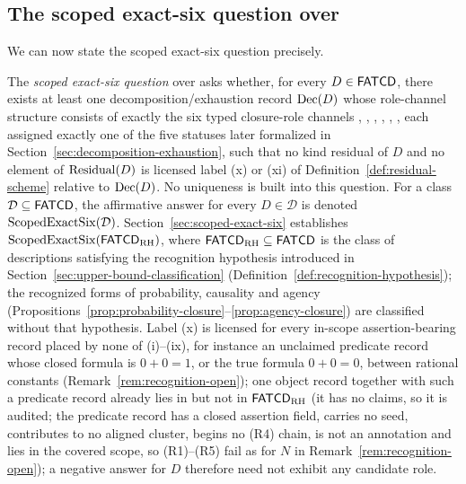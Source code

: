 \subsection{The scoped exact-six question over \FATCD{}}\label{subsec:scoped-exact-six-question}

We can now state the scoped exact-six question precisely.

\begin{definition}\label{def:scoped-exact-six-question}
The \emph{scoped exact-six question} over \FATCD{} asks whether, for every
\(D \in \mathsf{FATCD}{}\), there exists at least one decomposition/exhaustion record
\(\operatorname{Dec}\!\left(D\right)\) whose role-channel structure consists of exactly the six typed
closure-role channels \Pone{}, \Ptwo{}, \Pthree{}, \Pfour{}, \Pfive{},
\Psix{}, each assigned exactly one of the five statuses later formalized in
Section~\ref{sec:decomposition-exhaustion}, such that no kind residual of
\(D\) and no element of \(\operatorname{Residual}\!\left(D\right)\) is licensed label (x) or (xi) of
Definition~\ref{def:residual-scheme} relative to \(\operatorname{Dec}\!\left(D\right)\). No uniqueness is built into this
question. For a class \(\mathcal D\subseteq\mathsf{FATCD}{}\), the affirmative answer
for every \(D\in\mathcal D\) is denoted \(\operatorname{ScopedExactSix}\!\left(\mathcal D\right)\).
Section~\ref{sec:scoped-exact-six} establishes \(\operatorname{ScopedExactSix}\!\left(\mathsf{FATCD}_{\mathrm{RH}}\right)\),
where \(\mathsf{FATCD}_{\mathrm{RH}}\subseteq\mathsf{FATCD}{}\) is the class of descriptions
satisfying the recognition hypothesis introduced in
Section~\ref{sec:upper-bound-classification}
(Definition~\ref{def:recognition-hypothesis}); the recognized forms of
probability, causality and agency
(Propositions~\ref{prop:probability-closure}--\ref{prop:agency-closure}) are
classified without that hypothesis. Label (x) is licensed for every in-scope
assertion-bearing record placed by none of (i)--(ix), for instance an unclaimed
predicate record whose closed formula is \(0+0=1\), or the true formula \(0+0=0\), between rational constants (Remark~\ref{rem:recognition-open}); one object record together with such a predicate record already lies in \FATCD{} but not in \(\mathsf{FATCD}_{\mathrm{RH}}\) (it has no claims, so it is audited; the predicate record has a closed assertion field, carries no seed, contributes to no aligned cluster, begins no (R4) chain, is not an annotation and lies in the covered scope, so (R1)--(R5) fail as for \(N\) in Remark~\ref{rem:recognition-open});
a negative answer for \(D\) therefore need not exhibit any candidate role.
\end{definition}

